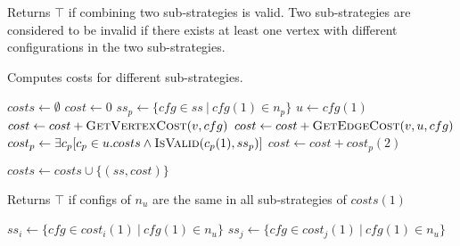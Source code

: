 \documentclass{article}
\newcommand{\set}[1]{\{#1\}}
\begin{document}
\begin{algorithm}
\caption{\label{alg:isvalid}Returns $\top$ if combining two sub-strategies is
	valid. Two sub-strategies are considered to be invalid if there exists at
	least one vertex with different configurations in the two sub-strategies.}

\begin{algorithmic}[1]

				\State \Return{$\bot$}
			\EndIf
		\EndFor
	\EndFor
	\Statex

	\State \Return{$\top$}

\EndProcedure
\end{algorithmic}
\end{algorithm}


\begin{algorithm}
	\caption{\label{alg:getcosts}Computes costs for different sub-strategies.}

\begin{algorithmic}[1]
	\State $costs \leftarrow \emptyset$
		\State $cost \leftarrow 0$
		\State $ss_p \leftarrow \set{cfg \in ss ~|~ cfg(1) \in n_p}$
		\Statex
			\State $u \leftarrow cfg(1)$
				\State $cost \leftarrow cost + \Call{GetVertexCost}{v, cfg}$
				\State $cost \leftarrow cost + \Call{GetEdgeCost}{v, u, cfg}$
				\State $cost_p \leftarrow \exists c_p [c_p \in u.costs \land
				\Call{IsValid}{c_p(1), ss_p}]$
				\State $cost \leftarrow cost + cost_p(2)$
			\EndIf
		\EndFor
		\Statex

		\State $costs \leftarrow costs \cup \set{(ss, cost)}$
	\EndFor

	\State {}

	\EndProcedure
\end{algorithmic}
\end{algorithm}


\begin{algorithm}
	\caption{\label{alg:hassamess}Returns $\top$ if configs of $n_u$ are the same
	in all sub-strategies of $costs(1)$}

\begin{algorithmic}[1]

			\State $ss_i \leftarrow \set{cfg \in cost_i(1) ~|~ cfg(1) \in n_u}$
			\State $ss_j \leftarrow \set{cfg \in cost_j(1) ~|~ cfg(1) \in n_u}$
				\State \Return{$\bot$}
			\EndIf
		\EndFor
	\EndFor
	\State \Return{$\top$}

	\EndProcedure
\end{algorithmic}
\end{algorithm}
\end{document}
